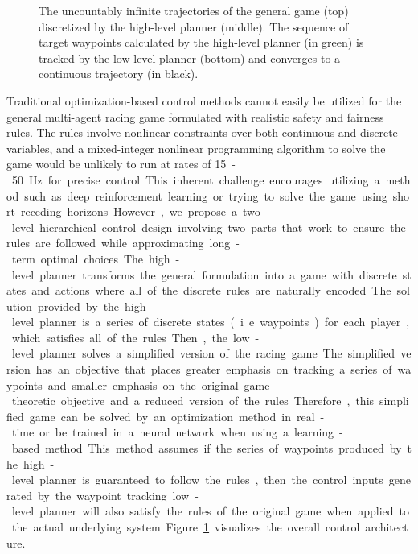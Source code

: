 \begin{figure}
  \caption[Hierarchical Control Architecture]{The uncountably infinite trajectories of the general game (top) discretized by the high-level planner (middle). The sequence of target waypoints calculated by the high-level planner (in green) is tracked by the low-level planner (bottom) and converges to a continuous trajectory (in black).}
  \label{fig:overall_control}
\end{figure}
Traditional optimization-based control methods cannot easily be utilized for the general multi-agent racing game formulated with realistic safety and fairness rules. The rules involve nonlinear constraints over both continuous and discrete variables, and a mixed-integer nonlinear programming algorithm to solve the game would be unlikely to run at rates of \SI{15}-\SI{50}{\hertz} for precise control. This inherent challenge encourages utilizing a method such as deep reinforcement learning or trying to solve the game using short receding horizons. 

However, we propose a two-level hierarchical control design involving two parts that work to ensure the rules are followed while approximating long-term optimal choices. The high-level planner transforms the general formulation into a game with discrete states and actions where all of the discrete rules are naturally encoded. The solution provided by the high-level planner is a series of discrete states (i.e waypoints) for each player, which satisfies all of the rules. Then, the low-level planner solves a simplified version of the racing game. The simplified version has an objective that places greater emphasis on tracking a series of waypoints and smaller emphasis on the original game-theoretic objective and a reduced version of the rules. Therefore, this simplified game can be solved by an optimization method in real-time or be trained in a neural network when using a learning-based method. 

This method assumes if the series of waypoints produced by the high-level planner is guaranteed to follow the rules, then the control inputs generated by the waypoint tracking low-level planner will also satisfy the rules of the original game when applied to the actual underlying system. Figure \ref{fig:overall_control} visualizes the overall control architecture. 

